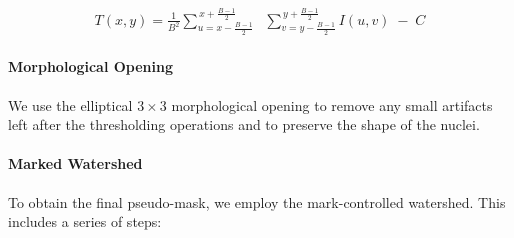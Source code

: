 \begin{align}
\label{eq:adaptive}
T(x,y)
=
\frac{1}{B^2}
\sum_{u = x - \frac{B-1}{2}}^{\,x + \frac{B-1}{2}}
\;\;
\sum_{v = y - \frac{B-1}{2}}^{\,y + \frac{B-1}{2}}
I(u,v)
\;-\; C
\end{align}

\paragraph{Morphological Opening}
We use the elliptical $3\!\times\!3$ morphological opening to remove any small artifacts left after the thresholding operations and to preserve the shape of the nuclei.

\paragraph{Marked Watershed}
To obtain the final pseudo-mask, we employ the mark-controlled watershed. This includes a series of steps:
